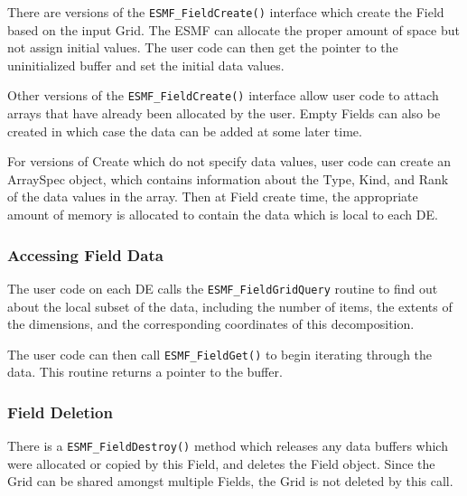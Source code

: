 There are versions of the {\tt ESMF\_FieldCreate()} interface
which create the Field based on the input Grid.  The ESMF
can allocate the proper amount of 
space but not assign initial values.  The user code
can then get the pointer to the uninitialized buffer and 
set the initial data values.

Other versions of the {\tt ESMF\_FieldCreate()} interface
allow user code to attach arrays that have already been
allocated by the user.  Empty Fields can also be created in
which case the data can be added at some later time.

For versions of Create which do not specify data values,
user code can create an ArraySpec object, which
contains information about the Type, Kind, and Rank of the
data values in the array.  Then at Field create time, the
appropriate amount of memory is allocated to contain the
data which is local to each DE.



\subsubsection{Accessing Field Data}

The user code on each DE calls the {\tt ESMF\_FieldGridQuery}
routine to find out about the local subset of the data, including
the number of items, the extents
of the dimensions, and the corresponding coordinates of this
decomposition.

The user code can then call {\tt ESMF\_FieldGet()} to
begin iterating through the data.  This routine returns a
pointer to the buffer.  

\subsubsection{Field Deletion}

There is a {\tt ESMF\_FieldDestroy()} method which releases
any data buffers which were allocated or copied by this Field,
and deletes the Field object.  Since the Grid can be shared
amongst multiple Fields, the Grid is not deleted by this call.
